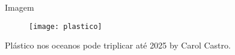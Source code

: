 \documentclass [11pt, a4paper]{beamer}
\begin{document}
\begin{frame}{Imagem}
\begin{figure} [h]
\begin{center}
\texttt{[image: plastico]}
\end{center}
\end{figure}
\begin{thebibliography}{}
Plástico nos oceanos pode triplicar até 2025 by Carol Castro.\par
[https://super.abril.com.br/ciencia/plastico-nos-oceanos-pode-triplicar-ate-2025]
\end{thebibliography}
\end{frame}
\end{document}
